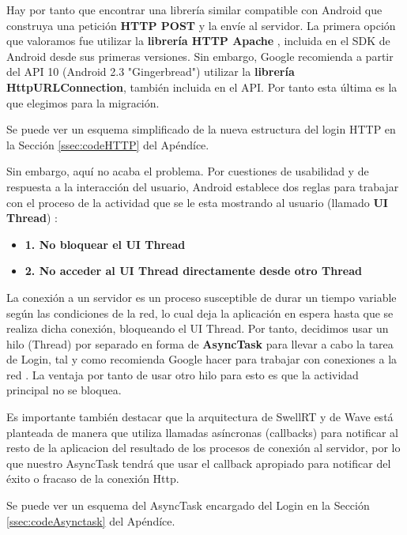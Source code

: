 	 Hay por tanto que encontrar una librería similar compatible con Android que construya una petición \textbf{HTTP POST} y la envíe al servidor. La primera opción que valoramos fue utilizar la \textbf{librería HTTP Apache} \cite{ref:apache_http}, incluida en el SDK de Android desde sus primeras versiones. Sin embargo, Google recomienda \cite{ref:http_recommmendations} a partir del API 10 (Android 2.3 "Gingerbread") utilizar la \textbf{librería HttpURLConnection}\cite{ref:android_httpUrlConnection}, también incluida en el API. Por tanto esta última es la que elegimos para la migración. 
	 
	 Se puede ver un esquema simplificado de la nueva estructura del login HTTP en la Sección \ref{ssec:codeHTTP} del Apéndíce.
	  
	 Sin embargo, aquí no acaba el problema. Por cuestiones de usabilidad y de respuesta a la interacción del usuario, Android establece dos reglas para trabajar con el proceso de la actividad que se le esta mostrando al usuario (llamado \textbf{UI Thread}) \cite{ref:android_processes}:
	  
	  \begin{itemize}
	  	\item \textbf{1. No bloquear el UI Thread}
	  	\item \textbf{2. No acceder al UI Thread directamente desde otro Thread}
	  \end{itemize}
	  
	  La conexión a un servidor es un proceso susceptible de durar un tiempo variable según las condiciones de la red, lo cual deja la aplicación en espera hasta que se realiza dicha conexión,  bloqueando el UI Thread. Por tanto, decidimos usar un hilo (Thread) por separado en forma de \textbf{AsyncTask} \cite{ref:android_asynctask} para llevar a cabo la tarea de Login, tal y como recomienda Google hacer para trabajar con conexiones a la red \cite{ref:android_networking}. La ventaja por tanto de usar otro hilo para esto es que la actividad principal no se bloquea.
	  	 
	  Es importante también destacar que la arquitectura de SwellRT y de Wave está planteada de manera que utiliza llamadas asíncronas (callbacks) para notificar al resto de la aplicacion del resultado de los procesos de conexión al servidor, por lo que nuestro AsyncTask tendrá que usar el callback apropiado para notificar del éxito o fracaso de la conexión Http.
	 
	  Se puede ver un esquema del AsyncTask encargado del Login en la Sección \ref{ssec:codeAsynctask} del Apéndíce.
	    
